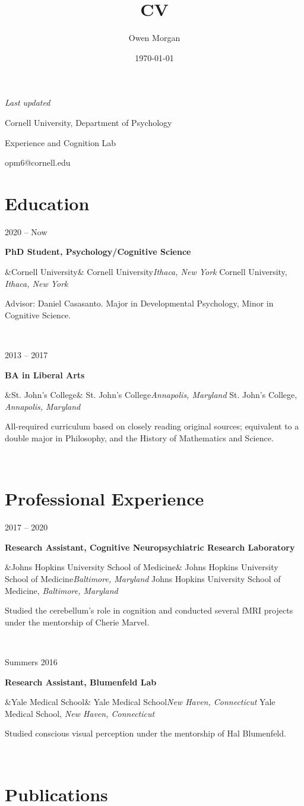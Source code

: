\documentclass{article}
\author{Owen Morgan}
\title{CV}
\date{\today}
\makeatletter
\newcommand{\entry}[5]{

  \begin{minipage}[t]{.15\textwidth}
    \begin{flushright}
      \hfill {#1}
    \end{flushright}
  \end{minipage}
  \hfill\vline\hfill
  \begin{minipage}[t]{.80\textwidth}
    \textbf{#2}

    \ifx&#3&
      {#3}\textit{#4}
    \else
      {#3, }\textit{#4}

    \fi
    \footnotesize{#5}
  \end{minipage}\\\vspace{.25cm}
}
\newcommand{\cu}{Cornell University}
\newcommand{\sjc}{St. John's College}
\newcommand{\jhusom}{Johns Hopkins University School of Medicine}
\renewcommand{\maketitle}{
  \begin{minipage}[t]{.5\textwidth}
    \begin{flushleft}
      \textit{Last updated \thedate}
    \end{flushleft}
  \end{minipage}
  \begin{minipage}[t]{.5\textwidth}
    \begin{flushright}
      {\huge\bfseries
      \theauthor}

      \vspace{.25em}

      \cu, Department of Psychology

      Experience and Cognition Lab

      opm6@cornell.edu

    \end{flushright}
  \end{minipage}
}
\makeatother
\begin{document}
\maketitle

\section{Education}

\entry
{2020 -- Now}
{PhD Student, Psychology/Cognitive Science}
{\cu}{Ithaca, New York}
{Advisor: Daniel Casasanto. Major in Developmental Psychology, Minor in Cognitive Science.}

\entry
{2013 -- 2017}
{BA in Liberal Arts}
{\sjc}{Annapolis, Maryland}
{All-required curriculum based on closely reading original sources; equivalent to a double major in Philosophy, and the History of Mathematics and Science.}

\section{Professional Experience}

\entry
{2017 -- 2020}
{Research Assistant, Cognitive Neuropsychiatric Research Laboratory}
{\jhusom}{Baltimore, Maryland}
{Studied the cerebellum’s role in cognition and conducted several fMRI projects under the mentorship of Cherie Marvel.}

\entry
{Summers 2016 }
{Research Assistant, Blumenfeld Lab}
{Yale Medical School}{New Haven, Connecticut}
{Studied conscious visual perception under the mentorship of Hal Blumenfeld.}

\section{Publications}



\newrefsection[pubs]
\nocite{*}
\printbibliography[heading=none]
\end{document}
